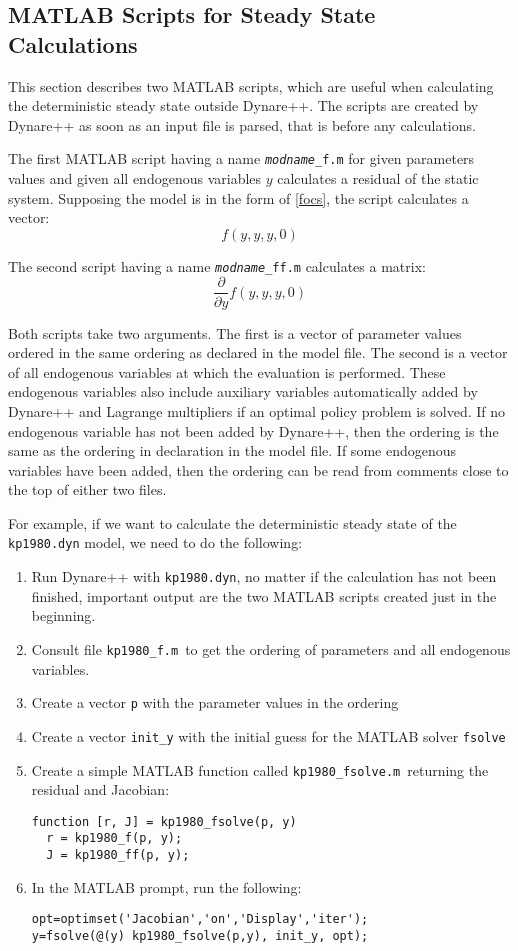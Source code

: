 \documentclass[10pt]{article}
\begin{document}
\subsection{MATLAB Scripts for Steady State Calculations}
\label{output_matlab_scripts}

This section describes two MATLAB scripts, which are useful when
calculating the deterministic steady state outside Dynare++. The
scripts are created by Dynare++ as soon as an input file is parsed,
that is before any calculations.

The first MATLAB script having a name {\tt {\it modname}\_f.m} for
given parameters values and given all endogenous variables $y$
calculates a residual of the static system. Supposing the model is in
the form of \eqref{focs}, the script calculates a vector:
\[
f(y,y,y,0)
\]

The second script having a name {\tt {\it modname}\_ff.m} calculates a matrix:
\[
\frac{\partial}{\partial y}f(y,y,y,0)
\]

Both scripts take two arguments. The first is a vector of parameter
values ordered in the same ordering as declared in the model file. The
second is a vector of all endogenous variables at which the evaluation
is performed. These endogenous variables also include auxiliary
variables automatically added by Dynare++ and Lagrange multipliers if
an optimal policy problem is solved. If no endogenous variable has not
been added by Dynare++, then the ordering is the same as the ordering
in declaration in the model file. If some endogenous variables have
been added, then the ordering can be read from comments close to the
top of either two files.

For example, if we want to calculate the deterministic steady state of
the {\tt kp1980.dyn} model, we need to do the following:
\begin{enumerate}
\item Run Dynare++ with {\tt kp1980.dyn}, no matter if the calculation
has not been finished, important output are the two MATLAB scripts
created just in the beginning.
\item Consult file {\tt kp1980\_f.m}\ to get the ordering of parameters
and all endogenous variables.
\item Create a vector {\tt p} with the parameter values in the ordering
\item Create a vector {\tt init\_y} with the initial guess for the
MATLAB solver {\tt fsolve}
\item Create a simple MATLAB function called {\tt kp1980\_fsolve.m}\ 
returning the residual and Jacobian:
{\small
\begin{verbatim}
function [r, J] = kp1980_fsolve(p, y)
  r = kp1980_f(p, y);
  J = kp1980_ff(p, y);
\end{verbatim}
}
\item In the MATLAB prompt, run the following:
{\small
\begin{verbatim}
opt=optimset('Jacobian','on','Display','iter');
y=fsolve(@(y) kp1980_fsolve(p,y), init_y, opt);
\end{verbatim}
}
\end{enumerate}
 
\end{document}
